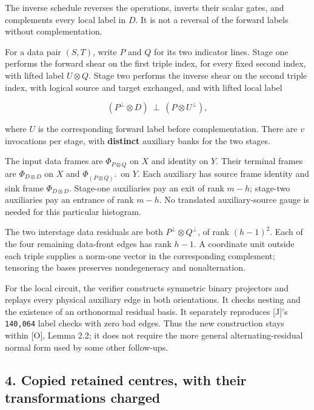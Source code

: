 \documentclass[
  11pt,
]{article}
\begin{document}
The inverse schedule reverses the operations, inverts their scalar
gates, and complements every local label in \(D\). It is not a reversal
of the forward labels without complementation.

For a data pair \((S,T)\), write \(P\) and \(Q\) for its two indicator
lines. Stage one performs the forward shear on the first triple index,
for every fixed second index, with lifted label \(U\otimes Q\). Stage
two performs the inverse shear on the second triple index, with logical
source and target exchanged, and with lifted local label

\[
 (P^\perp\otimes D)\ \perp\ (P\otimes U^\perp),
 \tag{3.1}
\]

where \(U\) is the corresponding forward label before complementation.
There are \(v\) invocations per stage, with \textbf{distinct} auxiliary
banks for the two stages.

The input data frames are \(\Phi_{P\otimes Q}\) on \(X\) and identity on
\(Y\). Their terminal frames are \(\Phi_{D\otimes D}\) on \(X\) and
\(\Phi_{(P\otimes Q)^\perp}\) on \(Y\). Each auxiliary has source frame
identity and sink frame \(\Phi_{D\otimes D}\). Stage-one auxiliaries pay
an exit of rank \(m-h\); stage-two auxiliaries pay an entrance of rank
\(m-h\). No translated auxiliary-source gauge is needed for this
particular histogram.

The two interstage data residuals are both \(P^\perp\otimes Q^\perp\),
of rank \((h-1)^2\). Each of the four remaining data-front edges has
rank \(h-1\). A coordinate unit outside each triple supplies a norm-one
vector in the corresponding complement; tensoring the bases preserves
nondegeneracy and nonalternation.

For the local circuit, the verifier constructs symmetric binary
projectors and replays every physical auxiliary edge in both
orientations. It checks nesting and the existence of an orthonormal
residual basis. It separately reproduces {[}J{]}'s \texttt{140,064}
label checks with zero bad edges. Thus the new construction stays within
{[}O{]}, Lemma 2.2; it does not require the more general
alternating-residual normal form used by some other follow-ups.

\subsection{4. Copied retained centres, with their transformations
charged}\label{copied-retained-centres-with-their-transformations-charged}
\end{document}
